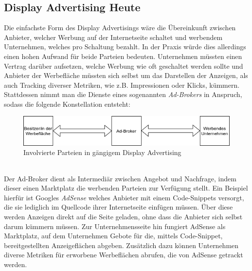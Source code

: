 \subsection{Display Advertising Heute}
Die einfachste Form des Display Advertisings wäre die Übereinkunft zwischen Anbieter, welcher Werbung auf der Internetseite schaltet und werbendem Unternehmen, welches pro Schaltung bezahlt. In der Praxis würde dies allerdings einen hohen Aufwand für beide Parteien bedeuten. Unternehmen müssten einen Vertrag darüber aufsetzen, welche Werbung wie oft geschaltet werden sollte und Anbieter der Werbefläche müssten sich selbst um das Darstellen der Anzeigen, als auch Tracking diverser Metriken, wie z.B. Impressionen oder Klicks, kümmern. Stattdessen nimmt man die Dienste eines sogenannten \emph{Ad-Brokers} in Anspruch, sodass die folgende Konstellation entsteht:
\begin{figure}[htpb]
	\centering
	\includegraphics[width=\textwidth]{images/online_advertising.png}
	\caption{Involvierte Parteien in gängigem Display Advertising}
	\label{6braun:fig:online_advertising}
\end{figure}\\
Der Ad-Broker dient als Intermediär zwischen Angebot und Nachfrage, indem dieser einen Marktplatz die werbenden Parteien zur Verfügung stellt. 
Ein Beispiel hierfür ist Googles \emph{AdSense} welches Anbieter mit einem Code-Snippets versorgt, die sie lediglich im Quellcode ihrer Internetseite einfügen müssen. Über diese werden Anzeigen direkt auf die Seite geladen, ohne dass die Anbieter sich selbst darum kümmern müssen. Zur Unternehmensseite hin fungiert AdSense als Marktplatz, auf dem Unternehmen Gebote für die, mittels Code-Snippet, bereitgestellten Anzeigeflächen abgeben. 
Zusätzlich dazu können Unternehmen diverse Metriken für erworbene Werbeflächen abrufen, die von AdSense getrackt werden. 
